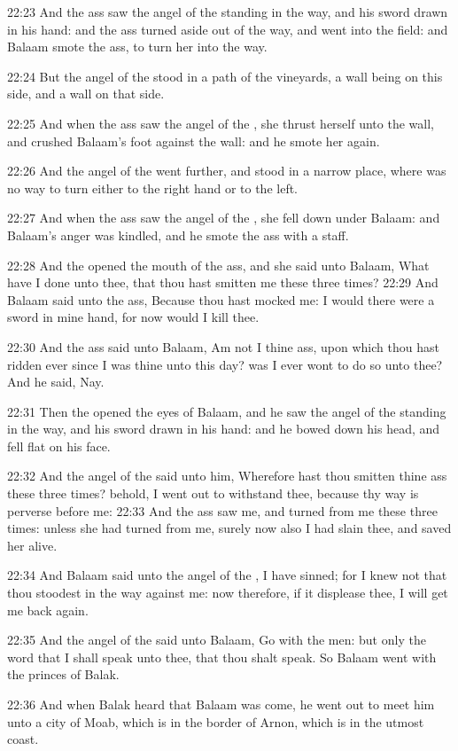 22:23 And the ass saw the angel of the \LORD standing in the way, and his sword drawn in his hand: and the ass turned aside out of the way, and went into the field: and Balaam smote the ass, to turn her into the way.

22:24 But the angel of the \LORD stood in a path of the vineyards, a wall being on this side, and a wall on that side.

22:25 And when the ass saw the angel of the \LORD, she thrust herself unto the wall, and crushed Balaam's foot against the wall: and he smote her again.

22:26 And the angel of the \LORD went further, and stood in a narrow place, where was no way to turn either to the right hand or to the left.

22:27 And when the ass saw the angel of the \LORD, she fell down under Balaam: and Balaam's anger was kindled, and he smote the ass with a staff.

22:28 And the \LORD opened the mouth of the ass, and she said unto Balaam, What have I done unto thee, that thou hast smitten me these three times?  22:29 And Balaam said unto the ass, Because thou hast mocked me: I would there were a sword in mine hand, for now would I kill thee.

22:30 And the ass said unto Balaam, Am not I thine ass, upon which thou hast ridden ever since I was thine unto this day? was I ever wont to do so unto thee? And he said, Nay.

22:31 Then the \LORD opened the eyes of Balaam, and he saw the angel of the \LORD standing in the way, and his sword drawn in his hand: and he bowed down his head, and fell flat on his face.

22:32 And the angel of the \LORD said unto him, Wherefore hast thou smitten thine ass these three times? behold, I went out to withstand thee, because thy way is perverse before me: 22:33 And the ass saw me, and turned from me these three times: unless she had turned from me, surely now also I had slain thee, and saved her alive.

22:34 And Balaam said unto the angel of the \LORD, I have sinned; for I knew not that thou stoodest in the way against me: now therefore, if it displease thee, I will get me back again.

22:35 And the angel of the \LORD said unto Balaam, Go with the men: but only the word that I shall speak unto thee, that thou shalt speak. So Balaam went with the princes of Balak.

22:36 And when Balak heard that Balaam was come, he went out to meet him unto a city of Moab, which is in the border of Arnon, which is in the utmost coast.

